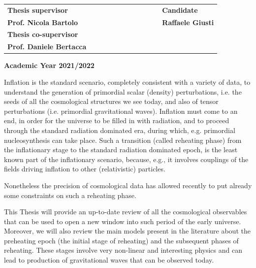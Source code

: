 \documentclass[11pt,a4paper,twoside]{book}
\newenvironment{abstract}{\cleardoublepage\thispagestyle{empty}\null\vfill\begin{center}\bfseries\abstractname\end{center}}{\vfill\null}
\begin{document}
\begin{titlepage}
		\vspace{20mm}
		\begin{spacing}{2}
			\begin{tabular}{ l  c  c c c  cc c c c c  l }
				{\Large{\bf Thesis supervisor}} &&&&&&&&&&& {\Large{\bf Candidate}}\\
				{\Large{\bf Prof. Nicola Bartolo}} &&&&&&&&&&& {\Large{\bf Raffaele Giusti}}\\
				{\Large{\bf Thesis co-supervisor}}\\
				{\Large{\bf Prof. Daniele Bertacca}}\\
			\end{tabular}
		\end{spacing}
		\vspace{15 mm}
		
		\begin{center}
			{\Large{\bf Academic Year 2021/2022}}
		\end{center}
	\end{titlepage}
	\clearpage{\pagestyle{empty}\cleardoublepage}

\begin{abstract}
	Inflation is the standard scenario, completely consistent with a variety of data, to understand the  
	generation of primordial scalar (density) perturbations, i.e.  the seeds of all the cosmological structures we  
	see today, and also of tensor perturbations (i.e. primordial gravitational waves). Inflation must come to an  
	end, in order for the universe to be filled in with radiation, and to proceed  through the standard radiation  
	dominated era, during which, e.g. primordial nucleosynthesis can take place. Such a transition (called  
	reheating phase) from the inflationary stage to the standard radiation dominated epoch, is the least known  
	part of the inflationary scenario, because, e.g., it involves couplings of the fields driving inflation to other  
	(relativistic) particles.  
	
	Nonetheless the precision of cosmological data has allowed recently to put already some constraints on  
	such a reheating phase.  
	
	This Thesis will provide an up-to-date review of all the cosmological observables that can be used to open  
	a new window into such period of the early universe. \\
	Moreover, we will also review the main models present in the literature about the preheating epoch (the initial stage of reheating) and the subsequent phases of reheating. These stages involve very non-linear and interesting physics and can lead to production of gravitational waves that can be observed today.
\end{abstract}
	
\end{document}
